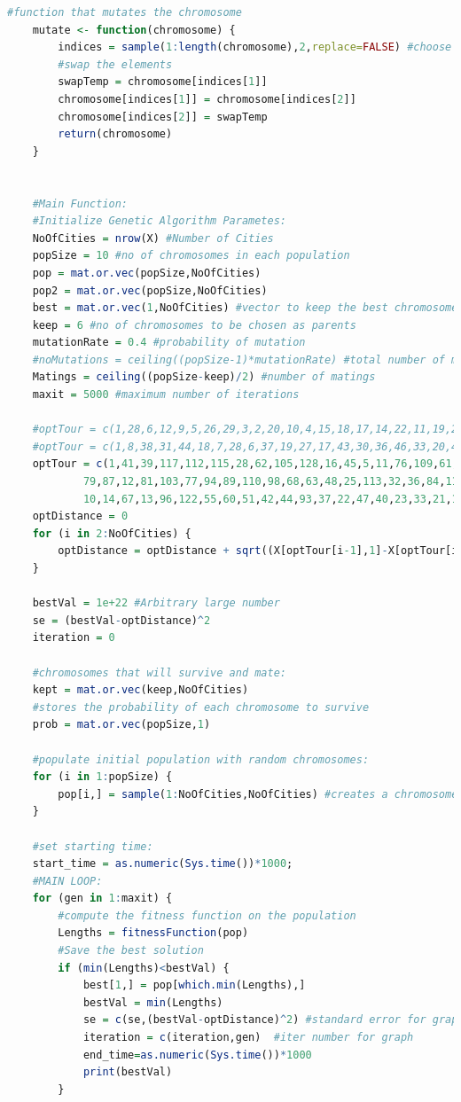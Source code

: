 \documentclass[11pt,a4paper,final]{article}
\begin{document}
\begin{lstlisting}[language = R,caption= Genetic Algorithm Code,label=GACode]
	#function that mutates the chromosome
	mutate <- function(chromosome) {
		indices = sample(1:length(chromosome),2,replace=FALSE) #choose 2 random indices in the chromosome
		#swap the elements
		swapTemp = chromosome[indices[1]]
		chromosome[indices[1]] = chromosome[indices[2]]
		chromosome[indices[2]] = swapTemp
		return(chromosome)
	}
	
	
	#Main Function:
	#Initialize Genetic Algorithm Parametes:
	NoOfCities = nrow(X) #Number of Cities
	popSize = 10 #no of chromosomes in each population
	pop = mat.or.vec(popSize,NoOfCities)
	pop2 = mat.or.vec(popSize,NoOfCities)
	best = mat.or.vec(1,NoOfCities) #vector to keep the best chromosome so far
	keep = 6 #no of chromosomes to be chosen as parents
	mutationRate = 0.4 #probability of mutation
	#noMutations = ceiling((popSize-1)*mutationRate) #total number of mutations
	Matings = ceiling((popSize-keep)/2) #number of matings
	maxit = 5000 #maximum number of iterations
	
	#optTour = c(1,28,6,12,9,5,26,29,3,2,20,10,4,15,18,17,14,22,11,19,25,7,23,27,8,24,16,13,21)#bays29
	#optTour = c(1,8,38,31,44,18,7,28,6,37,19,27,17,43,30,36,46,33,20,47,21,32,39,48,5,42,24,10,45,35,4,26,2,29,34,41,16,22,3,23,14,25,13,11,12,15,40,9)#att48
	optTour = c(1,41,39,117,112,115,28,62,105,128,16,45,5,11,76,109,61,129,124,64,69,86,88,26,7,97,70,107,127,104,43,34,17,31,27,19,100,15,29,24,116,95,
			79,87,12,81,103,77,94,89,110,98,68,63,48,25,113,32,36,84,119,111,123,101,82,57,9,56,65,52,75,74,99,73,92,38,106,53,120,58,49,72,91,6,102,
			10,14,67,13,96,122,55,60,51,42,44,93,37,22,47,40,23,33,21,126,121,78,66,85,125,90,59,30,83,3,114,108,8,18,46,80,118,20,4,35,54,2,50,130,71)#ch130
	optDistance = 0
	for (i in 2:NoOfCities) {
		optDistance = optDistance + sqrt((X[optTour[i-1],1]-X[optTour[i],1])^2+(Y[optTour[i-1],1]-Y[optTour[i],1])^2)
	}
	
	bestVal = 1e+22 #Arbitrary large number
	se = (bestVal-optDistance)^2
	iteration = 0
	
	#chromosomes that will survive and mate:
	kept = mat.or.vec(keep,NoOfCities)
	#stores the probability of each chromosome to survive
	prob = mat.or.vec(popSize,1)
	
	#populate initial population with random chromosomes:
	for (i in 1:popSize) {
		pop[i,] = sample(1:NoOfCities,NoOfCities) #creates a chromosome
	}
	
	#set starting time:
	start_time = as.numeric(Sys.time())*1000;
	#MAIN LOOP:
	for (gen in 1:maxit) {
		#compute the fitness function on the population
		Lengths = fitnessFunction(pop)
		#Save the best solution 
		if (min(Lengths)<bestVal) {
			best[1,] = pop[which.min(Lengths),]
			bestVal = min(Lengths)
			se = c(se,(bestVal-optDistance)^2) #standard error for graph
			iteration = c(iteration,gen)  #iter number for graph
			end_time=as.numeric(Sys.time())*1000
			print(bestVal)
		}
	

\end{lstlisting}
\end{document}
